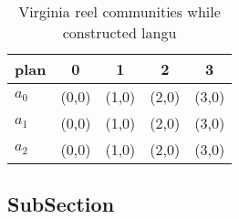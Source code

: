 \documentclass[a4paper]{article}
\begin{document}
\begin{table}
\begin{adjustbox}{width=0.6\columnwidth}
\begin{tabular}{|l|l|l|l|l|}
\hline
\textbf{plan} & \multicolumn{1}{c|}{\textbf{0}} & \multicolumn{1}{c|}{\textbf{1}} & \multicolumn{1}{c|}{\textbf{2}} & \multicolumn{1}{c|}{\textbf{3}} \\ \hline
\textbf{$a_0$}  & (0,0) & (1,0) & (2,0) & (3,0) \\ \hline
\textbf{$a_1$}  & (0,0) & (1,0) & (2,0) & (3,0) \\ \hline
\textbf{$a_2$}  & (0,0) & (1,0) & (2,0) & (3,0) \\ \hline
\end{tabular}
\end{adjustbox}
\caption{Virginia reel communities while constructed langu
}
\end{table}

\subsection{SubSection}
\end{document}
